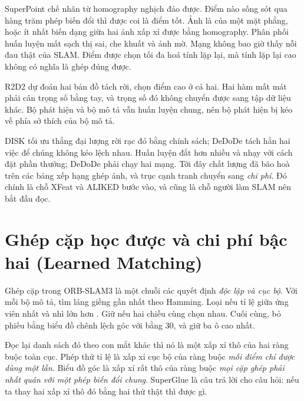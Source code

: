 \documentclass[../../deep_learning.tex]{subfiles}
\begin{document}
\begin{mach}
\item {}
\gp SuperPoint chế nhãn từ homography nghịch đảo được. Điểm nào sống sót qua hàng trăm phép biến đổi thì được coi là điểm tốt.
\gd Ảnh là của một mặt phẳng, hoặc ít nhất biến dạng giữa hai ảnh xấp xỉ được bằng homography.
\gia Phân phối huấn luyện mất sạch thị sai, che khuất và ảnh mờ. Mạng không bao giờ thấy nỗi đau thật của SLAM.
\vdm Điểm được chọn tối đa hoá tính lặp lại, mà tính lặp lại cao không có nghĩa là ghép đúng được.
\item {}
\gp R2D2 dự đoán hai bản đồ tách rời, chọn điểm cao ở cả hai.
\gia Hai hàm mất mát phải cân trọng số bằng tay, và trọng số đó không chuyển được sang tập dữ liệu khác.
\vdm Bộ phát hiện và bộ mô tả vẫn huấn luyện chung, nên bộ phát hiện bị kéo về phía sở thích của bộ mô tả.
\item {}
\gp DISK tối ưu thẳng đại lượng rời rạc đó bằng  chính sách; DeDoDe tách hẳn hai việc để chúng không kéo lệch nhau.
\gia Huấn luyện đắt hơn nhiều và nhạy với cách đặt phần thưởng; DeDoDe phải chạy hai mạng.
\hq Tới đây chất lượng đã bão hoà trên các bảng xếp hạng ghép ảnh, và trục cạnh tranh chuyển sang \emph{chi phí}. Đó chính là chỗ XFeat và ALIKED bước vào, và cũng là chỗ người làm SLAM nên bắt đầu đọc.
\end{mach}

\section{Ghép cặp học được và chi phí bậc hai (Learned Matching)}
Ghép cặp trong ORB-SLAM3 là một chuỗi các quyết định \emph{độc lập và cục bộ}. Với mỗi bộ mô tả, tìm láng giềng gần nhất theo Hamming. Loại nếu tỉ lệ giữa ứng viên nhất và nhì lớn hơn . Giữ nếu hai chiều cùng chọn nhau. Cuối cùng, bỏ phiếu bằng biểu đồ chênh lệch góc với  bằng 30, và giữ ba ô cao nhất.

Đọc lại danh sách đó theo con mắt khác thì nó là một xấp xỉ thô của hai ràng buộc toàn cục. Phép thử tỉ lệ là xấp xỉ cục bộ của ràng buộc \emph{mỗi điểm chỉ được dùng một lần}. Biểu đồ góc là xấp xỉ rất thô của ràng buộc \emph{mọi cặp ghép phải nhất quán với một phép biến đổi chung}. SuperGlue là câu trả lời cho câu hỏi: nếu ta thay hai xấp xỉ thô đó bằng hai thứ thật thì được gì.
\end{document}
